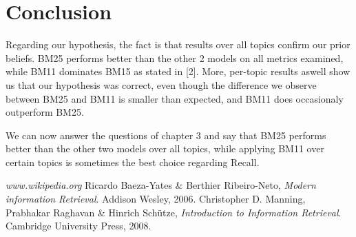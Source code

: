 \documentclass[letterpaper,11pt]{article}
\begin{document}
\section{Conclusion}

Regarding our hypothesis, the fact is that results over all topics confirm our prior beliefs. BM25 performs better than the other 2 models on all metrics examined, while BM11 dominates BM15 as stated in [2]. More, per-topic results aswell show us that our hypothesis was correct, even though the difference we observe between BM25 and BM11 is smaller than expected, and BM11 does occasionaly outperform BM25.

We can now answer the questions of chapter 3 and say that BM25 performs better than the other two models over all topics, while applying BM11 over certain topics is sometimes the best choice regarding Recall.


\begin{thebibliography}{9}
\emph{www.wikipedia.org}
  Ricardo Baeza-Yates \& Berthier Ribeiro-Neto,
   \emph{Modern information Retrieval}.
  Addison Wesley,
  2006.
  Christopher D. Manning, Prabhakar Raghavan \& Hinrich Schütze,
  \emph{Introduction to Information Retrieval}.
  Cambridge University Press,
  2008.



\end{thebibliography}

    
\end{document}
